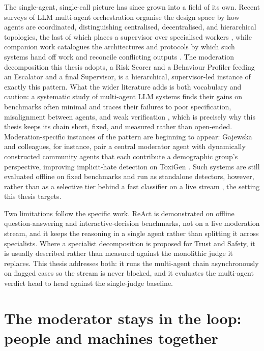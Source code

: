 The single-agent, single-call picture has since grown into a field of its own. Recent surveys of LLM multi-agent orchestration organise the design space by how agents are coordinated, distinguishing centralised, decentralised, and hierarchical topologies, the last of which places a supervisor over specialised workers \citep{maorchestration2026}, while companion work catalogues the architectures and protocols by which such systems hand off work and reconcile conflicting outputs \citep{orchestrationarch2026}. The moderation decomposition this thesis adopts, a Risk Scorer and a Behaviour Profiler feeding an Escalator and a final Supervisor, is a hierarchical, supervisor-led instance of exactly this pattern. What the wider literature adds is both vocabulary and caution: a systematic study of multi-agent LLM systems finds their gains on benchmarks often minimal and traces their failures to poor specification, misalignment between agents, and weak verification \citep{cemri2025mast}, which is precisely why this thesis keeps its chain short, fixed, and measured rather than open-ended. Moderation-specific instances of the pattern are beginning to appear: Gajewska and colleagues, for instance, pair a central moderator agent with dynamically constructed community agents that each contribute a demographic group's perspective, improving implicit-hate detection on ToxiGen \citep{communitymod2026}. Such systems are still evaluated offline on fixed benchmarks and run as standalone detectors, however, rather than as a selective tier behind a fast classifier on a live stream , the setting this thesis targets.

Two limitations follow the specific work. ReAct \citep{react2023} is demonstrated on offline question-answering and interactive-decision benchmarks, not on a live moderation stream, and it keeps the reasoning in a single agent rather than splitting it across specialists. Where a specialist decomposition is proposed for Trust and Safety, it is usually described rather than measured against the monolithic judge it replaces. This thesis addresses both: it runs the multi-agent chain asynchronously on flagged cases so the stream is never blocked, and it evaluates the multi-agent verdict head to head against the single-judge baseline.

\section{The moderator stays in the loop: people and machines together}\label{human-in-the-loop}


